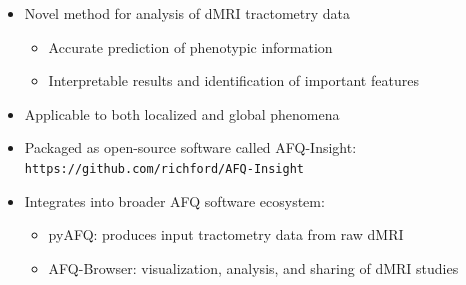 \documentclass[a0paper,portrait,fontscale=0.395]{baposter}
\begin{document}
\begin{poster}
{%

\begin{itemize}[nosep, leftmargin=*]
\item Novel method for analysis of dMRI tractometry data

    \begin{itemize}[nosep, leftmargin=*]
    \item Accurate prediction of phenotypic information
    \item Interpretable results and identification of important features
    \end{itemize}

\item Applicable to both localized and global phenomena
\item Packaged as open-source software called AFQ-Insight: \texttt{https://github.com/richford/AFQ-Insight}

\item Integrates into broader AFQ software ecosystem:
    \begin{itemize}[nosep, leftmargin=*]
    \item pyAFQ: produces input tractometry data from raw dMRI
    \item AFQ-Browser: visualization, analysis, and sharing of dMRI studies
    \end{itemize}
\end{itemize}
}




\end{poster}
\end{document}
